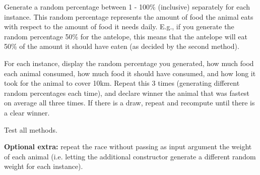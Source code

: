 \documentclass[a4paper,12pt]{article}
\begin{document}
\begin{enumerate}[label=11ø.\arabic*,start=0]
  Generate a random percentage between 1 - 100\% (inclusive) separately for each instance. This random percentage represents the amount of food the animal eats with respect to the amount of food it needs daily. E.g., if you generate the random percentage 50\% for the antelope, this means that the antelope will eat 50\% of the amount it should have eaten (as decided by the second method). 
  
  For each instance, display the random percentage you generated, how much food each animal consumed, how much food it should have consumed, and how long it took for the animal to cover 10km. 
  Repeat this 3 times (generating different random percentages each time), and declare winner the animal that was fastest on average all three times. If there is a draw, repeat and recompute until there is a clear winner.
  
  Test all methods. %
  
  \textbf{Optional extra:} repeat the race without passing as input argument the weight of each animal (i.e. letting the additional constructor generate a different random weight for each instance).
  

\end{enumerate}
\end{document}
